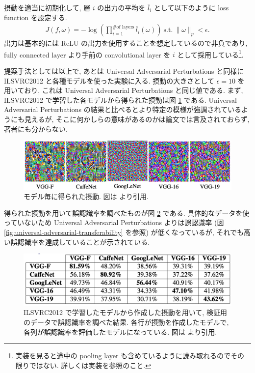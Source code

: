 摂動を適当に初期化して, 層 $i$ の出力の平均を $\bar{l}_i$ として以下のように loss function を設定する.
%
\begin{eqnarray}
J(f, \omega) = - \log \left(\prod_{i = 1}^{\text{\# of layers}} \bar{l}_i (\omega) \right) \ \text{s.t.} \ \|\omega\|_p < \epsilon.
\label{eq:fast-feature-loss}
\end{eqnarray}
%
出力は基本的には ReLU の出力を使用することを想定しているので非負であり, fully connected layer より手前の convolutional layer を $i$ として採用している\footnote{
実装を見ると途中の pooling layer も含めているように読み取れるのでその限りではない.
詳しくは実装を参照のこと.
}.

提案手法としては以上で, あとは Universal Adversarial Perturbations と同様に ILSVRC2012 と各種モデルを使った実験に入る.
摂動の大きさとして $\epsilon = 10$ を用いており, これは Universal Adversarial Perturbations と同じ値である.
まず, ILSVRC2012 で学習した各モデルから得られた摂動は図 \ref{fig:fast-feature-perturbations} である.
Universal Adversarial Perturbations の結果と比べるとより特定の模様が強調されているようにも見えるが, そこに何かしらの意味があるのかは論文では言及されておらず, 著者にも分からない.
%
\begin{figure}[htbp]
\begin{center}
\includegraphics[width=14.0cm]{figures/fast-feature-perturbations.pdf}
\end{center}
\caption{
モデル毎に得られた摂動.
図は \cite{mopuri2017fast} より引用.
}
\label{fig:fast-feature-perturbations}
\end{figure}
%

得られた摂動を用いて誤認識率を調べたものが図 \ref{fig:fast-feature-transferability} である.
具体的なデータを使っていないため Universal Adversarial Perturbations よりは誤認識率 (図 \ref{fig:universal-adversarial-transferability} を参照) が低くなっているが, それでも高い誤認識率を達成していることが示されている.
%
\begin{figure}[htbp]
\begin{center}
\includegraphics[width=14.0cm]{figures/fast-feature-transferability.pdf}
\end{center}
\caption{
ILSVRC2012 で学習したモデルから作成した摂動を用いて, 検証用のデータで誤認識率を調べた結果.
各行が摂動を作成したモデルで, 各列が誤認識率を評価したモデルになっている.
図は \cite{mopuri2017fast} より引用.
}
\label{fig:fast-feature-transferability}
\end{figure}
%

